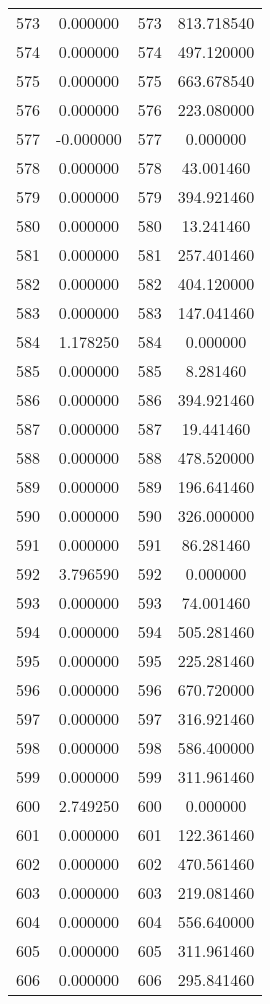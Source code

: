 \documentclass[12pt]{article}
\begin{document}
\begin{longtable}{@{}cccc@{}}
573 & 0.000000 & 573 & 813.718540 \\
574 & 0.000000 & 574 & 497.120000 \\
575 & 0.000000 & 575 & 663.678540 \\
576 & 0.000000 & 576 & 223.080000 \\
577 & -0.000000 & 577 & 0.000000 \\
578 & 0.000000 & 578 & 43.001460 \\
579 & 0.000000 & 579 & 394.921460 \\
580 & 0.000000 & 580 & 13.241460 \\
581 & 0.000000 & 581 & 257.401460 \\
582 & 0.000000 & 582 & 404.120000 \\
583 & 0.000000 & 583 & 147.041460 \\
584 & 1.178250 & 584 & 0.000000 \\
585 & 0.000000 & 585 & 8.281460 \\
586 & 0.000000 & 586 & 394.921460 \\
587 & 0.000000 & 587 & 19.441460 \\
588 & 0.000000 & 588 & 478.520000 \\
589 & 0.000000 & 589 & 196.641460 \\
590 & 0.000000 & 590 & 326.000000 \\
591 & 0.000000 & 591 & 86.281460 \\
592 & 3.796590 & 592 & 0.000000 \\
593 & 0.000000 & 593 & 74.001460 \\
594 & 0.000000 & 594 & 505.281460 \\
595 & 0.000000 & 595 & 225.281460 \\
596 & 0.000000 & 596 & 670.720000 \\
597 & 0.000000 & 597 & 316.921460 \\
598 & 0.000000 & 598 & 586.400000 \\
599 & 0.000000 & 599 & 311.961460 \\
600 & 2.749250 & 600 & 0.000000 \\
601 & 0.000000 & 601 & 122.361460 \\
602 & 0.000000 & 602 & 470.561460 \\
603 & 0.000000 & 603 & 219.081460 \\
604 & 0.000000 & 604 & 556.640000 \\
605 & 0.000000 & 605 & 311.961460 \\
606 & 0.000000 & 606 & 295.841460 \\

\end{longtable}
\end{document}
